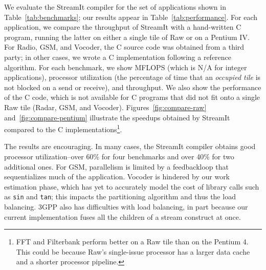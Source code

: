 We evaluate the StreamIt compiler for the set of applications shown in
Table~\ref{tab:benchmarks}; our results appear in
Table~\ref{tab:performance}.
For each application, we compare the throughput of StreamIt with a
hand-written C program, running the latter on either a single tile of
Raw or on a Pentium IV.  For Radio, GSM, and Vocoder, the C source
code was obtained from a third party; in other cases, we wrote a C
implementation following a reference algorithm.  For each benchmark,
we show MFLOPS (which is N/A for integer applications), processor
utilization (the percentage of time that an {\it occupied tile} is not
blocked on a send or receive), and throughput.  We also show the
performance of the C code, which is not available for C programs that
did not fit onto a single Raw tile (Radar, GSM, and Vocoder).
Figures~\ref{fig:compare-raw} and~\ref{fig:compare-pentium} illustrate
the speedups obtained by StreamIt compared to the C
implementations\footnote{FFT and Filterbank perform better on a Raw
tile than on the Pentium 4.  This could be because Raw's single-issue
processor has a larger data cache and a shorter processor pipeline.}.

The results are encouraging.  In many cases, the StreamIt compiler
obtains good processor utilization--over 60\% for four benchmarks and
over 40\% for two additional ones.  For GSM, parallelism is limited by
a feedbackloop that sequentializes much of the application.  Vocoder
is hindered by our work estimation phase, which has yet to accurately
model the cost of library calls such as {\tt sin} and {\tt tan}; this
impacts the partitioning algorithm and thus the load balancing.  3GPP
also has difficulties with load balancing, in part because our current
implementation fuses all the children of a stream construct at once.

